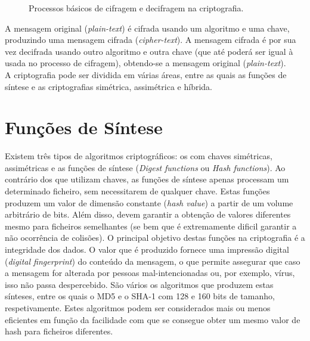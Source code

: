 \documentclass[a4paper,11pt,openright,oneside]{report}
\begin{document}
\begin{figure}[ht]
\center
{}
\caption{Processos básicos de cifragem e decifragem na criptografia.}
\label{fig:crypto0}
\end{figure}

A mensagem original (\textit{plain-text}) é cifrada usando um algoritmo e uma chave, produzindo uma mensagem cifrada (\textit{cipher-text}). A mensagem cifrada é por sua vez decifrada usando outro algoritmo e outra chave (que até poderá ser igual à usada no processo de cifragem), obtendo-se a mensagem original (\textit{plain-text}).\\

A criptografia pode ser dividida em várias áreas, entre as quais as funções de síntese e as criptografias simétrica, assimétrica e híbrida.

\section{Funções de Síntese}

Existem três tipos de algoritmos criptográficos: os com chaves simétricas, assimétricas e as funções de síntese (\textit{Digest functions} ou \textit{Hash functions}). Ao contrário dos que utilizam chaves, as funções de síntese apenas processam um determinado ficheiro, sem necessitarem de qualquer chave. Estas funções produzem um valor de dimensão constante (\textit{hash value}) a partir de um volume arbitrário de bits. Além disso, devem garantir a obtenção de valores diferentes mesmo para ficheiros semelhantes (se bem que é extremamente dificil garantir a não ocorrência de colisões). O principal objetivo destas funções na criptografia é a integridade dos dados. O valor que é produzido fornece uma impressão digital (\textit{digital fingerprint}) do conteúdo da mensagem, o que permite assegurar que caso a mensagem for alterada por pessoas mal-intencionadas ou, por exemplo, vírus, isso não passa despercebido. São vários os algoritmos que produzem estas sínteses, entre os quais o MD5 e o SHA-1 com 128 e 160 bits de tamanho, respetivamente. Estes algoritmos podem ser considerados mais ou menos eficientes em função da facilidade com que se consegue obter um mesmo valor de hash para ficheiros diferentes.\\
\end{document}
